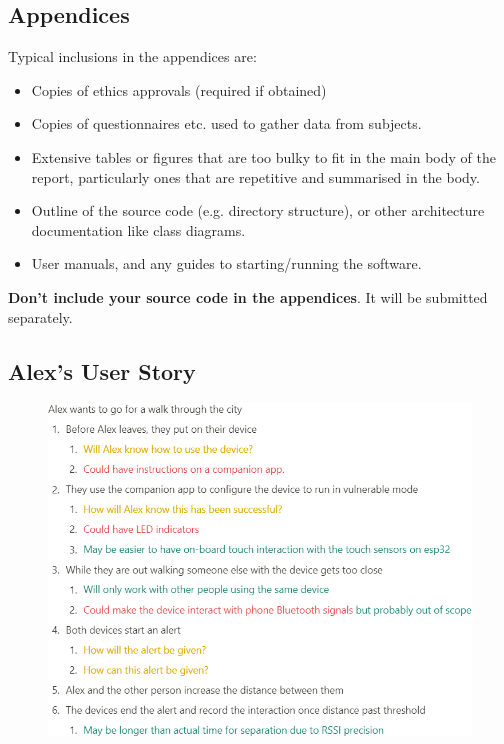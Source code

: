 \documentclass{l4proj}
\begin{document}
%
% 

\begin{appendices}

    \chapter{Appendices}

    Typical inclusions in the appendices are:

    \begin{itemize}
        \item
              Copies of ethics approvals (required if obtained)
        \item
              Copies of questionnaires etc. used to gather data from subjects.
        \item
              Extensive tables or figures that are too bulky to fit in the main body of
              the report, particularly ones that are repetitive and summarised in the body.

        \item Outline of the source code (e.g. directory structure), or other architecture documentation like class diagrams.

        \item User manuals, and any guides to starting/running the software.

    \end{itemize}

    \textbf{Don't include your source code in the appendices}. It will be
    submitted separately.

    \section{Alex's User Story}

    \begin{figure}[!htb]
        \centering
        \includegraphics[width=1.0\linewidth]{images/user_story.png}


\end{figure}
\end{appendices}
\end{document}
